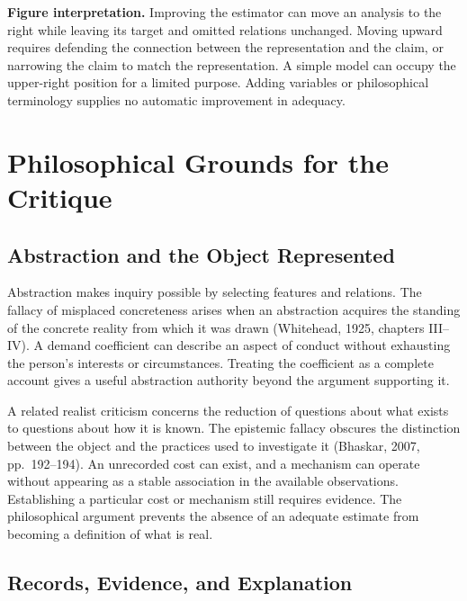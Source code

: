\textbf{Figure interpretation.} Improving the estimator can move an
analysis to the right while leaving its target and omitted relations
unchanged. Moving upward requires defending the connection between the
representation and the claim, or narrowing the claim to match the
representation. A simple model can occupy the upper-right position for a
limited purpose. Adding variables or philosophical terminology supplies
no automatic improvement in adequacy.


\hypertarget{M09-philosophical-grounds-for-the-critique}{%
\section{Philosophical Grounds for the
Critique}\label{M09-philosophical-grounds-for-the-critique}}

\noindent \hypertarget{M09-abstraction-and-the-object-represented}{%
\subsection{Abstraction and the Object
Represented}\label{M09-abstraction-and-the-object-represented}}

\noindent \noindent Abstraction makes inquiry possible by selecting features and
relations. The fallacy of misplaced concreteness arises when an
abstraction acquires the standing of the concrete reality from which it
was drawn (Whitehead, 1925, chapters III--IV). A demand coefficient can
describe an aspect of conduct without exhausting the person's interests
or circumstances. Treating the coefficient as a complete account gives a
useful abstraction authority beyond the argument supporting it.

A related realist criticism concerns the reduction of questions about
what exists to questions about how it is known. The epistemic fallacy
obscures the distinction between the object and the practices used to
investigate it (Bhaskar, 2007, pp.~192--194). An unrecorded cost can
exist, and a mechanism can operate without appearing as a stable
association in the available observations. Establishing a particular
cost or mechanism still requires evidence. The philosophical argument
prevents the absence of an adequate estimate from becoming a definition
of what is real.

\hypertarget{M09-records-evidence-and-explanation}{%
\subsection{Records, Evidence, and
Explanation}\label{M09-records-evidence-and-explanation}}

